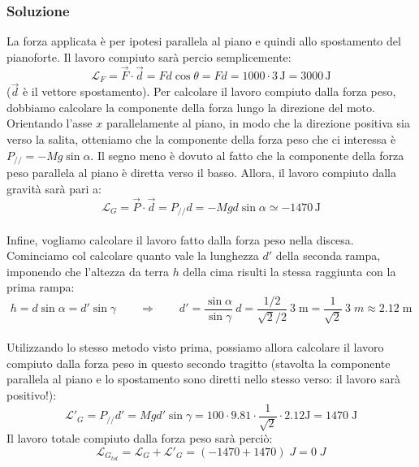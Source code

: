 \documentclass[12pt,a4paper]{book}
\begin{document}
\subsubsection*{Soluzione}

La forza applicata è per ipotesi parallela al piano e quindi allo spostamento del pianoforte. Il lavoro compiuto sarà percio semplicemente:\\
\begin{equation*}
\mathcal{L}
_F =  \vec{F} \cdot \vec{d} = Fd \cos \theta = Fd= 1000 \cdot 3 \, \text{J} = 3000 \, \text{J}
\end{equation*}
($\vec{d}$ è il vettore spostamento).  Per calcolare il lavoro compiuto dalla forza peso, dobbiamo calcolare la componente della forza lungo la direzione del moto. Orientando l'asse $x$ parallelamente al piano, in modo che la direzione positiva sia verso la salita, otteniamo che la componente della forza peso che ci interessa è $P_{//} = -M g \sin\alpha$. Il segno meno è dovuto al fatto che la componente della forza peso parallela al piano è diretta verso il basso. Allora, il lavoro compiuto dalla gravità sarà pari a:\\
\begin{equation*}
\mathcal{L}
_G = \vec{P} \cdot \vec{d} =P_{//} d= -Mg d \sin\alpha \simeq  -1470 \, \text{J}
\end{equation*}\\

Infine, vogliamo calcolare il lavoro fatto dalla forza peso nella discesa. Cominciamo col calcolare quanto vale la lunghezza $d'$ della seconda rampa, imponendo che l'altezza da terra $h$ della cima risulti la stessa raggiunta con la prima rampa:\\
\begin{equation*}
h=d \sin\alpha = d' \sin\gamma \qquad \Rightarrow  \qquad d' = \frac{\sin\alpha}{\sin\gamma} \ d = \frac{1/2}{\sqrt{2}/2} \: 3 \; \text{m} = \frac{1}{\sqrt{2}} \: 3 \; m \approx 2.12 \; \text{m}
\end{equation*}\\
Utilizzando lo stesso metodo visto prima, possiamo allora calcolare il lavoro compiuto dalla forza peso in questo secondo tragitto (stavolta la componente parallela al piano e lo spostamento sono diretti nello stesso verso: il lavoro sarà positivo!):\\
\begin{equation*}
\mathcal{L}
'_G = P_{//} d' = M g d' \sin\gamma = 100 \cdot 9.81 \cdot \frac{1}{\sqrt{2}} \cdot 2.12 \text{J} = 1470 \; \text{J}
\end{equation*}
Il lavoro totale compiuto dalla forza peso sarà perciò:\\
\begin{equation*}
\mathcal{L}
_{G_{tot}}= \mathcal{L}
_G + \mathcal{L}
'_G = (-1470 + 1470) \; J = 0 \; J
\end{equation*}\\
\end{document}
